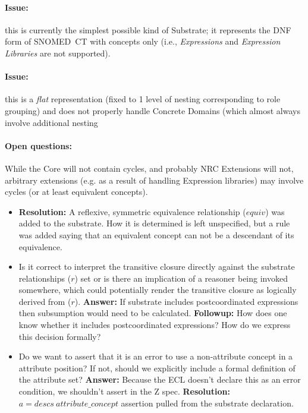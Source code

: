 \documentclass{article}
\begin{document}
\paragraph{Issue:} this is currently the simplest possible kind of Substrate; it represents the DNF form of SNOMED~CT with concepts only
(i.e., \textit{Expressions} and \textit{Expression Libraries} are not supported).

\paragraph{Issue:} this is a \textit{flat} representation (fixed to 1 level of nesting corresponding to role grouping) and does not properly handle Concrete Domains (which almost always involve additional nesting

\paragraph{Open questions:}
While the Core will not contain cycles, and probably NRC Extensions will not, arbitrary extensions (e.g. as a result of handling Expression libraries) may involve cycles (or at least equivalent concepts).
\begin{itemize}
\item \textbf{Resolution: } A reflexive, symmetric equivalence relationship ($equiv$) was added to the substrate.  How it is determined is left unspecified, but a rule was added saying that an equivalent concept can not be a descendant of its equivalence.
\item Is it correct to interpret the transitive closure directly against the substrate relationships ($r$) set or is there an implication of a reasoner being invoked somewhere, which 
could potentially render the transitive closure as logically derived from ($r$).  \textbf{Answer: } If substrate includes postcoordinated expressions then subsumption would need to be calculated. \textbf{Followup: } How does one know whether it includes postcoordinated expressions?  How do we express this decision formally?
\item Do we want to assert that it is an error to use a non-attribute concept in a attribute position?  If not, should we explicitly include a formal definition of the attribute set? \textbf{Answer: }  Because the ECL doesn't declare this as an error condition, we shouldn't assert in the Z spec.  \textbf{Resolution: } $   a = descs~attribute\_concept $ assertion pulled from the substrate declaration.
\end{itemize}
\end{document}
